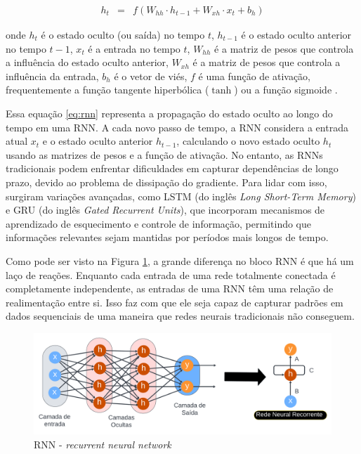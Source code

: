  
 \begin{eqnarray}
 	h_t &=& f(W_{hh} \cdot h_{t-1} + W_{xh} \cdot x_t + b_h)\label{eq:rnn}
 \end{eqnarray}
 
 \noindent onde \( h_t \) é o estado oculto (ou saída) no tempo \( t \), \( h_{t-1} \) é o estado oculto anterior no tempo \( t-1 \), \( x_t \) é a entrada no tempo \( t \), \( W_{hh} \) é a matriz de pesos que controla a influência do estado oculto anterior, \( W_{xh} \) é a matriz de pesos que controla a influência da entrada, \( b_h \) é o vetor de viés, \( f \) é uma função de ativação, frequentemente a função tangente hiperbólica ($\operatorname{tanh}$) ou a função sigmoide \cite{lstm}.
 
 
 Essa equação \eqref{eq:rnn} representa a propagação do estado oculto ao longo do tempo em uma RNN. A cada novo passo de tempo, a RNN considera a entrada atual \( x_t \) e o estado oculto anterior \( h_{t-1} \), calculando o novo estado oculto \( h_t \) usando as matrizes de pesos e a função de ativação.
 No entanto, as RNNs tradicionais podem enfrentar dificuldades em capturar dependências de longo prazo, devido ao problema de dissipação do gradiente. Para lidar com isso, surgiram variações avançadas, como LSTM (do inglês \textit{Long Short-Term Memory})  e GRU (do inglês \textit{Gated Recurrent Units}), que incorporam mecanismos de aprendizado de esquecimento e controle de informação, permitindo que informações relevantes sejam mantidas por períodos mais longos de tempo.
 
 Como pode ser visto na Figura \ref{fig:rnn1}, a grande diferença no bloco RNN é que há um laço de reações. Enquanto cada entrada de uma rede totalmente conectada é completamente independente, as entradas de uma RNN têm uma relação de realimentação entre si. Isso faz com que ele seja capaz de capturar padrões em dados sequenciais de uma maneira que redes neurais tradicionais não conseguem.

 
 
 \begin{figure}[!htb]
 	\centering
 	\caption{RNN - \textit{recurrent neural network}}
 	\label{fig:rnn1}
 	\includegraphics[width=\linewidth]{Modelos/Figuras/rnn1}
 	
 \end{figure}
 
